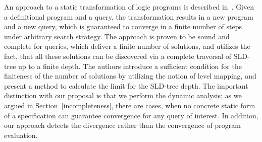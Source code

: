 An approach to a static transformation of logic programs is described in~\cite{BoundedNondeterminism}. Given a definitional program and
a query, the transformation results in a new program and a new query, which is guaranteed to converge in a finite number of steps
under arbitrary search strategy. The approach is proven to be sound and complete for queries, which deliver a finite number of solutions,
and utilizes the fact, that all these solutions can be discovered via a complete traversal of SLD-tree up to a finite depth. The
authors introduce a sufficient condition for the finiteness of the number of solutions by utilizing the notion of level mapping, and
present a method to calculate the limit for the SLD-tree depth. The important distinction with our proposal is that we perform the
dynamic analysis; as we argued in Section~\ref{incompleteness}, there are cases, when no concrete static form of a specification can
guarantee convergence for any query of interest. In addition, our approach detects the divergence rather than the
convergence of program evaluation.
